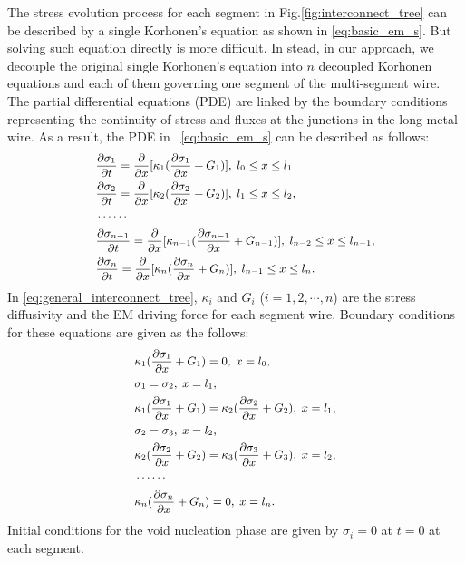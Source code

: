 The stress evolution process for each segment in
Fig.\ref{fig:interconnect_tree} can be described by a single
Korhonen's equation as shown in \eqref{eq:basic_em_s}. But solving
such equation directly is more difficult.  In stead, in our approach,
we decouple the original single Korhonen's equation into $n$
decoupled Korhonen equations and each of them governing one segment of
the multi-segment wire. The partial differential equations (PDE) are
linked by the boundary conditions representing the continuity of
stress and fluxes at the junctions in the long metal wire. As a
result, the PDE in ~\eqref{eq:basic_em_s} can be described as follows:
\begin{equation} \label{eq:general_interconnect_tree}\small
\begin{split}
&\frac{\partial \sigma_1}{\partial t}=\frac{\partial }{\partial
x}[\kappa_1(\frac{\partial \sigma_1}{\partial x}+G_1)],\;l_0\leq x \leq l_1 \\
&\frac{\partial \sigma_2}{\partial t}=\frac{\partial }{\partial
x}[\kappa_2(\frac{\partial \sigma_2}{\partial
x}+G_2)],\;l_1\leq x \leq l_2, \\
&\cdots\cdots\\
&\frac{\partial \sigma_{n-1}}{\partial t}=\frac{\partial }{\partial
x}[\kappa_{n-1}(\frac{\partial \sigma_{n-1}}{\partial
x}+G_{n-1})],\;l_{n-2}\leq x \leq l_{n-1}, \\
&\frac{\partial \sigma_{n}}{\partial t}=\frac{\partial }{\partial
x}[\kappa_{n}(\frac{\partial \sigma_{n}}{\partial
x}+G_{n})],\;l_{n-1}\leq x \leq l_n.
 \end{split}
 \end{equation}
 In \eqref{eq:general_interconnect_tree}, $\kappa_{i}$ and $G_i$
 ($i=1,2,\cdots,n$) are the stress diffusivity and the EM driving
 force for each segment wire. Boundary conditions for these equations
 are given as the follows:
 \begin{equation} \label{bc:general_interconnect_tree}\small
\begin{split}
&\kappa_1(\frac{\partial \sigma_1}{\partial x}+G_1)=0,\;x=l_0,\\
&\sigma_1=\sigma_2,\;x=l_1,\\
&\kappa_1(\frac{\partial \sigma_1}{\partial
x}+G_1)=\kappa_2(\frac{\partial \sigma_2}{\partial
x}+G_2),\;x=l_1,\\
&\sigma_2=\sigma_3,\;x=l_2,\\
&\kappa_2(\frac{\partial \sigma_2}{\partial
x}+G_2)=\kappa_3(\frac{\partial \sigma_3}{\partial
x}+G_3),\;x=l_2,\\
&\cdots\cdots \\
&\kappa_n(\frac{\partial \sigma_n}{\partial
x}+G_n)=0,\;x=l_n.
 \end{split}
 \end{equation}
 Initial conditions for the void nucleation phase are given by
 $\sigma_i=0$ at $t=0$ at each segment.

